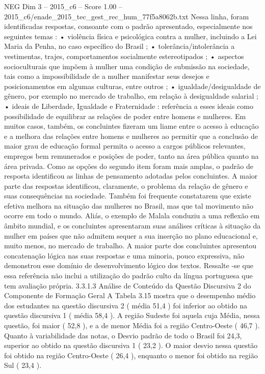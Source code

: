 \begin{textsample}{NEG Dim 3 – 2015\_c6 – Score 1.00 – 2015\_c6/enade\_2015\_tec\_gest\_rec\_hum\_77f5a8062b.txt}
Nessa linha, foram identificadas respostas, consoante com o padrão apresentado, especialmente nos seguintes temas : • violência física e psicológica contra a mulher, incluindo a Lei Maria da Penha, no caso específico do Brasil ; • tolerância/intolerância a vestimentas, trajes, comportamentos socialmente estereotipados ; • aspectos socioculturais que impõem à mulher uma condição de submissão na sociedade, tais como a impossibilidade de a mulher manifestar seus desejos e posicionamentos em algumas culturas, entre outros ; • igualdade/desigualdade de gênero, por exemplo no mercado de trabalho, em relação à desigualdade salarial ; • ideais de Liberdade, Igualdade e Fraternidade : referência a esses ideais como possibilidade de equilibrar as relações de poder entre homens e mulheres.
Em muitos casos, também, os concluintes fizeram um liame entre o acesso à educação e a melhora das relações entre homens e mulheres ao permitir que a conclusão de maior grau de educação formal permita o acesso a cargos públicos relevantes, empregos bem remunerados e posições de poder, tanto na área pública quanto na área privada.
Como as opções do segundo item foram mais amplas, o padrão de resposta identificou as linhas de pensamento adotadas pelos concluintes.
A maior parte das respostas identificou, claramente, o problema da relação de gênero e suas consequências na sociedade.
Também foi frequente constatarem que existe efetiva melhora na situação das mulheres no Brasil, mas que tal movimento não ocorre em todo o mundo.
Aliás, o exemplo de Malala conduziu a uma reflexão em âmbito mundial, e os concluintes apresentaram suas análises críticas à situação da mulher em países que não admitem sequer a sua inserção no plano educacional e, muito menos, no mercado de trabalho.
A maior parte dos concluintes apresentou concatenação lógica nas suas respostas e uma minoria, pouco expressiva, não demonstrou esse domínio de desenvolvimento lógico dos textos.
Ressalte -se que essa referência não inclui a utilização do padrão culto da língua portuguesa que tem avaliação própria. 3.3.1.3 Análise de Conteúdo da Questão Discursiva 2 do Componente de Formação Geral A Tabela 3.15 mostra que o desempenho médio dos estudantes na questão discursiva 2 ( média 51,4 ) foi inferior ao obtido na questão discursiva 1 ( média 58,4 ).
A região Sudeste foi aquela cuja Média, nessa questão, foi maior ( 52,8 ), e a de menor Média foi a região Centro-Oeste ( 46,7 ).
Quanto à variabilidade das notas, o Desvio padrão de todo o Brasil foi 24,3, superior ao obtido na questão discursiva 1 ( 23,2 ).
O maior desvio nessa questão foi obtido na região Centro-Oeste ( 26,4 ), enquanto o menor foi obtido na região Sul ( 23,4 ).

\end{textsample}
